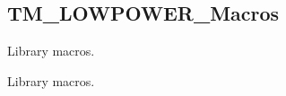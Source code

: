 \hypertarget{group___t_m___l_o_w_p_o_w_e_r___macros}{}\subsection{T\+M\+\_\+\+L\+O\+W\+P\+O\+W\+E\+R\+\_\+\+Macros}
\label{group___t_m___l_o_w_p_o_w_e_r___macros}


Library macros.  


Library macros. 

